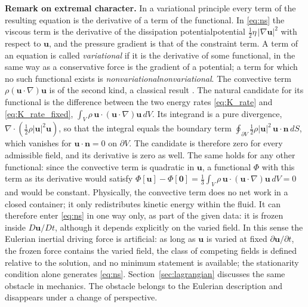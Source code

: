 \documentclass[12pt]{article}
\newif\ifhighlight \highlightfalse
\newif\ifhighlightfirst \highlightfirstfalse
\DeclareRobustCommand{\chg}[1]{\ifhighlight\ifhighlightfirst\textcolor{revised}{#1}\else#1\fi\else#1\fi}
\DeclareRobustCommand{\chgb}[1]{\ifhighlight\textcolor{revisedb}{#1}\else#1\fi}
\begin{document}
\textbf{Remark on extremal character.} In a variational principle every term of the resulting equation is the derivative of a term of the functional. In \eqref{eq:ns} the viscous term is the derivative of the dissipation \chg{potential} $\tfrac{1}{2}\eta\,|\nabla\boldsymbol{u}|^2$ with respect to $\boldsymbol{u}$, and the pressure gradient is that of the constraint term. A term of an equation is called \textit{variational} if it is the derivative of some functional, in the same way as a conservative force is the gradient of a potential; a term for which no such functional exists is \textit{\chg{nonvariational}}. The convective term $\rho(\boldsymbol{u}\cdot\nabla)\boldsymbol{u}$ is of the second kind, a classical result \cite{finlayson1972}. The natural candidate for its functional is the difference between the two energy rates \eqref{eq:K_rate} and \eqref{eq:K_rate_fixed}, $\int_V \rho\,\boldsymbol{u}\cdot(\boldsymbol{u}\cdot\nabla)\boldsymbol{u}\, dV$. Its integrand is a pure divergence, $\nabla\cdot(\tfrac{1}{2}\rho|\boldsymbol{u}|^2\boldsymbol{u})$, so that the integral equals the boundary term $\oint_{\partial V} \tfrac{1}{2}\rho|\boldsymbol{u}|^2\, \boldsymbol{u}\cdot\boldsymbol{n}\, dS$, which vanishes for $\boldsymbol{u}\cdot\boldsymbol{n} = 0$ on $\partial V$. The candidate is therefore zero for every admissible field, and its derivative is zero as well. The same holds for any other functional: since the convective term is quadratic in $\boldsymbol{u}$, a functional $\Phi$ with this term as its derivative would satisfy $\Phi[\boldsymbol{u}] - \Phi[\boldsymbol{0}] = \tfrac{1}{3}\int_V \rho\,\boldsymbol{u}\cdot(\boldsymbol{u}\cdot\nabla)\boldsymbol{u}\, dV = 0$ and would be constant. Physically, the convective term does no net work in a closed container; it only redistributes kinetic energy within the fluid. It can therefore enter \eqref{eq:ns} in one way only, as part of the given data: it is frozen inside $D\boldsymbol{u}/Dt$, although it depends explicitly on the varied field. In this sense the Eulerian inertial driving force is artificial: as long as $\boldsymbol{u}$ is varied at fixed $\partial\boldsymbol{u}/\partial t$, the frozen force contains the varied field, the class of competing fields is defined relative to the solution, and no minimum statement is available; the stationarity condition alone generates \eqref{eq:ns}. Section~\ref{sec:lagrangian} \chgb{discusses} the same obstacle in mechanics. The obstacle belongs to the Eulerian description and disappears under a change of perspective.
\end{document}
